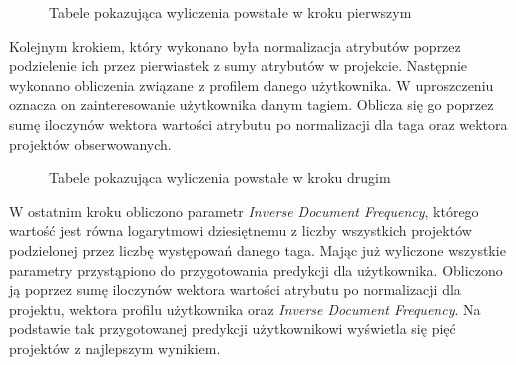 \begin{figure}[h!]
	\caption{Tabele pokazująca wyliczenia powstałe w kroku pierwszym}
	\centering
\end{figure}

Kolejnym krokiem, który wykonano była normalizacja atrybutów poprzez podzielenie ich przez pierwiastek z sumy atrybutów w projekcie. Następnie wykonano obliczenia związane z profilem danego użytkownika. W uproszczeniu oznacza on zainteresowanie użytkownika danym tagiem. Oblicza się go poprzez sumę iloczynów wektora wartości atrybutu po normalizacji dla taga oraz wektora projektów obserwowanych.

\begin{figure}[h!]
	\caption{Tabele pokazująca wyliczenia powstałe w kroku drugim}
	\centering
\end{figure}

\bigskip
\bigskip

W ostatnim kroku obliczono parametr \textit{Inverse Document Frequency}, którego wartość jest równa logarytmowi dziesiętnemu z liczby wszystkich projektów podzielonej przez liczbę występowań danego taga. Mając już wyliczone wszystkie parametry przystąpiono do przygotowania predykcji dla użytkownika. Obliczono ją poprzez sumę iloczynów wektora wartości atrybutu po normalizacji dla projektu, wektora profilu użytkownika oraz \textit{Inverse Document Frequency}. Na podstawie tak przygotowanej predykcji użytkownikowi wyświetla się pięć projektów z najlepszym wynikiem. 

